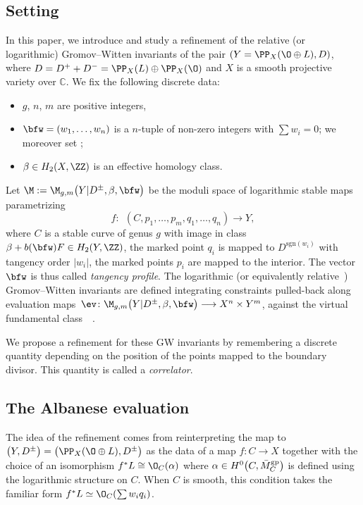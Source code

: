 \subsection{Setting}

In this paper, we introduce and study a refinement of the relative (or logarithmic) Gromov--Witten invariants \cite{abramovich2014stable,gross2013logarithmic,kim2010logarithmic,li2001stable} of the pair $(Y=\PP_X(\O\oplus L),D)$, where $D=D^+ + D^-=\PP_X(L)\oplus\PP_X(\O)$ and $X$ is a smooth projective variety over $\mathbb C$. We fix the following discrete data:
\begin{itemize}\itemsep=0pt
 \item $g$, $n$, $m$ are positive integers,
 \item $\bfw=(w_1,\dots,w_n)$ is a $n$-tuple of non-zero integers with $\sum w_i=0$; we moreover set ;
 \item $\beta\in H_2(X,\ZZ)$ is an effective homology class.
\end{itemize}
Let $\M:=\M_{g,m}\bigl(Y|D^{\pm},\beta,\bfw\bigr)$ be the moduli space of logarithmic stable maps parametrizing
\[
f\colon\ \ (C,p_1,\dots,p_m,q_1,\dots,q_n)\to Y,
 \]
where $C$ is a stable curve of genus $g$ with image in class $\beta+b(\bfw)F\in H_2(Y,\ZZ)$, the marked point $q_i$ is mapped to $D^{\mathrm{sgn}(w_i)}$ with tangency order $|w_i|$, the marked points $p_i$ are mapped to the interior. The vector $\bfw$ is thus called \textit{tangency profile}.
The logarithmic (or equivalently relative~\cite{abramovich2014comparison}) Gromov--Witten invariants are defined integrating constraints pulled-back along evaluation maps~${
\ev \colon \M_{g,m}\bigl(Y|D^{\pm},\beta,\bfw\bigr) \longrightarrow X^n\times Y^m}$,
 against the virtual fundamental class~\smash{$\vir{\M}$}~\cite{gross2013logarithmic}.

 We propose a refinement for these GW invariants by remembering a discrete quantity depending on the position of the points mapped to the boundary divisor. This quantity is called a \textit{correlator}.

\subsection{The Albanese evaluation}
The idea of the refinement comes from reinterpreting the map to $\bigl(Y, D^\pm\bigr)=\bigl(\PP_X(\O\oplus L), D^\pm\bigr)$ as the data of a map $f\colon C\to X$ together with the choice of an isomorphism $f^*L\cong\O_C(\alpha)$ where $\alpha\in H^0\bigl(C,\bar{M}_C^{\rm gp}\bigr)$ is defined using the logarithmic structure on $C$. When $C$ is smooth, this condition takes the familiar form $f^*L\simeq\O_C(\sum w_i q_i)$.

